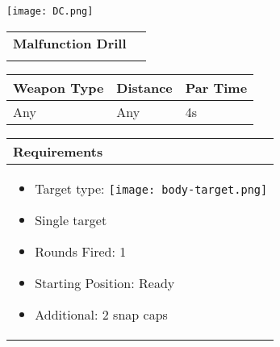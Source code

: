 \documentclass[../Cover.tex]{subfiles}
\begin{document}
	\begin{minipage}[t][0.2\textheight][t]{0.1\textwidth} 
		\texttt{[image: DC.png]}
	\end{minipage}
	\hfill
	\begin{minipage}[t][0.2\textheight][t]{0.8\textwidth}
		\begin{tabular}{ p{} l  }
			\\
			\textbf{Malfunction Drill} \\
			\\[0.09\textheight]
		\end{tabular}
		\quad
		\begin{tabular}{ | p{} | p{} | p{} |}
			\hline
			\rowcolor[HTML]{C0C0C0}\tiny Weapon Type & \tiny Distance & \tiny Par Time\\ 
			\hline
			\tiny Any & \tiny Any & \tiny 4s \\ %
			\hline
		\end{tabular}
	\end{minipage}
	\begin{tabular}{p{}}
		\small Requirements \\
		\hline
		\tiny \begin{itemize} %
			\item Target type: \texttt{[image: body-target.png]}
			\item Single target			
			\item Rounds Fired: 1
			\item Starting Position: Ready
			\item Additional: 2 snap caps
		\end{itemize}				
		\\[0.6\textheight]
	\end{tabular}
\end{document}
